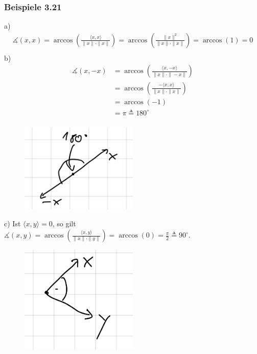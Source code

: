 \documentclass{article}
\begin{document}
\subsubsection*{Beispiele 3.21}
a) 
\begin{align*}
    \measuredangle (x,x) = \arccos \left( \frac{\langle x,x \rangle}{\|x\| \cdot \|x\|} \right) = \arccos \left( \frac{\|x\|^2}{\|x\| \cdot \|x\|} \right) = \arccos(1) = 0 \\
\end{align*}
b) 
\begin{align*}
    \measuredangle (x,-x) &= \arccos \left( \frac{\langle x,-x \rangle}{\|x\| \cdot \|-x\|} \right)\\
    &= \arccos \left( \frac{-\langle x,x \rangle}{\|x\| \cdot \|x\|} \right) \\
    &= \arccos(-1) \\
    &= \pi \triangleq 180^\circ \\
\end{align*}
\begin{figure}[h]
    \centering
    \includegraphics[width=0.5\textwidth]{Images/3.21b.jpeg}

\end{figure}
c) 
Ist $\langle x,y \rangle = 0$, so gilt $\measuredangle (x,y) = \arccos \left( \frac{\langle x,y \rangle}{\|x\| \cdot \|y\|} \right) = \arccos(0) = \frac{\pi}{2} \triangleq 90^\circ$. \\
\begin{figure}[h]
    \centering
    \includegraphics[width=0.5\textwidth]{Images/3.21c.jpeg}

\end{figure}
\\
\end{document}
